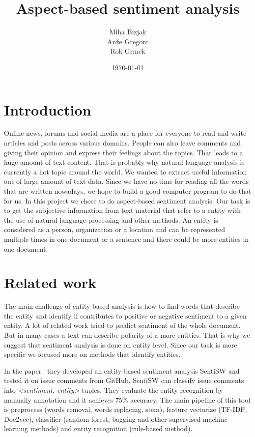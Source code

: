 \documentclass[a4paper, 12pt]{article}
\title{Aspect-based sentiment analysis}
\author{Miha Bizjak \\ Anže Gregorc \\ Rok Grmek}
\date{\today}
\begin{document}
\maketitle



\section{Introduction}

Online news, forums and social media are a place for everyone to read and write articles and posts across various domains. 
People can also leave comments and giving their opinion and express their feelings about the topics. 
That leads  to a huge amount of text content. 
That is probably why natural language analysis is currently a hot topic around the world.
We wanted to extract useful information out of large amount of text data. Since we have no time for reading all the words that are written nowadays, we hope to build a good computer program to do that for us.
In this project we chose to do aspect-based sentiment analysis. 
Our task is to get the subjective information from text material that refer to a entity with the use of natural language processing and other methods. 
An entity is considered as a person, organization or a location and can be represented multiple times in one document or a sentence and there could be more entities in one document.



\section{Related work}

The main challenge of entity-based analysis is how to find words that describe the entity and identify if contributes to positive or negative sentiment to a given entity. 
A lot of related work tried to predict sentiment of the whole document. 
But in many cases a text can describe polarity of a more entities. 
That is why we suggest that sentiment analysis is done on entity level.
Since our task is more specific we focused more on methods that identify entities.

In the paper~\cite{ding2018entity} they developed an entity-based sentiment analysis SentiSW and tested it on issue comments from GitHub.
SentiSW can classify issue comments into \emph{<sentiment, entity>} tuples. 
They evaluate the entity recognition by manually annotation and it achieves 75\% accuracy. 
The main pipeline of this tool is preprocess (words removal, words replacing, stem), feature vectorize (TF-IDF, Doc2vec), classifier (random forest, bagging and other supervised machine learning methods) and entity recognition (rule-based method). 
\end{document}
